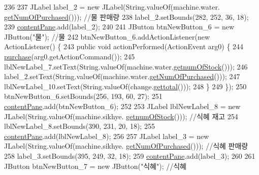 \begin{DoxyCode}
236                 
237         JLabel label\_2 = \textcolor{keyword}{new} JLabel(String.valueOf(machine.water.
      \hyperlink{class_vending_machine_1_1_product_aefa8a5881c5569171a8cf1161b4bd911}{getNumOfPurchased}())); \textcolor{comment}{//물 판매량}
238         label\_2.setBounds(282, 252, 36, 18);
239         \hyperlink{class_vending_machine_1_1_machine_u_i_ac8ef25585e46da798d067af0eefa1a03}{contentPane}.add(label\_2);
240         
241         JButton btnNewButton\_6 = \textcolor{keyword}{new} JButton(\textcolor{stringliteral}{"물"}); \textcolor{comment}{//물}
242         btnNewButton\_6.addActionListener(\textcolor{keyword}{new} ActionListener() \{
243             \textcolor{keyword}{public} \textcolor{keywordtype}{void} actionPerformed(ActionEvent arg0) \{
244                 \hyperlink{class_vending_machine_1_1_machine_u_i_aadccf593dc69281c9ebbfe1fbe09b804}{purchase}(arg0.getActionCommand());
245                 lblNewLabel\_7.setText(String.valueOf(machine.water.\hyperlink{class_vending_machine_1_1_product_a199bec8565bf69e9231248a49076a01b}{getnumOfStock}()));
246                 label\_2.setText(String.valueOf(machine.water.\hyperlink{class_vending_machine_1_1_product_aefa8a5881c5569171a8cf1161b4bd911}{getNumOfPurchased}()));
247                 lblNewLabel\_10.setText(String.valueOf(change.\hyperlink{class_vending_machine_1_1_change_a07a32d7240178343fa1273d075d73c64}{gettotal}()));
248             \}
249         \});
250         btnNewButton\_6.setBounds(256, 193, 60, 27);
251         \hyperlink{class_vending_machine_1_1_machine_u_i_ac8ef25585e46da798d067af0eefa1a03}{contentPane}.add(btnNewButton\_6);
252         
253         JLabel lblNewLabel\_8 = \textcolor{keyword}{new} JLabel(String.valueOf(machine.sikhye.
      \hyperlink{class_vending_machine_1_1_product_a199bec8565bf69e9231248a49076a01b}{getnumOfStock}())); \textcolor{comment}{//식혜 재고}
254         lblNewLabel\_8.setBounds(390, 231, 20, 18);
255         \hyperlink{class_vending_machine_1_1_machine_u_i_ac8ef25585e46da798d067af0eefa1a03}{contentPane}.add(lblNewLabel\_8);
256         
257         JLabel label\_3 = \textcolor{keyword}{new} JLabel(String.valueOf(machine.sikhye.
      \hyperlink{class_vending_machine_1_1_product_aefa8a5881c5569171a8cf1161b4bd911}{getNumOfPurchased}())); \textcolor{comment}{//식혜 판매량}
258         label\_3.setBounds(395, 249, 32, 18);
259         \hyperlink{class_vending_machine_1_1_machine_u_i_ac8ef25585e46da798d067af0eefa1a03}{contentPane}.add(label\_3);        
260         
261         JButton btnNewButton\_7 = \textcolor{keyword}{new} JButton(\textcolor{stringliteral}{"식혜"}); \textcolor{comment}{//식혜}

\end{DoxyCode}

